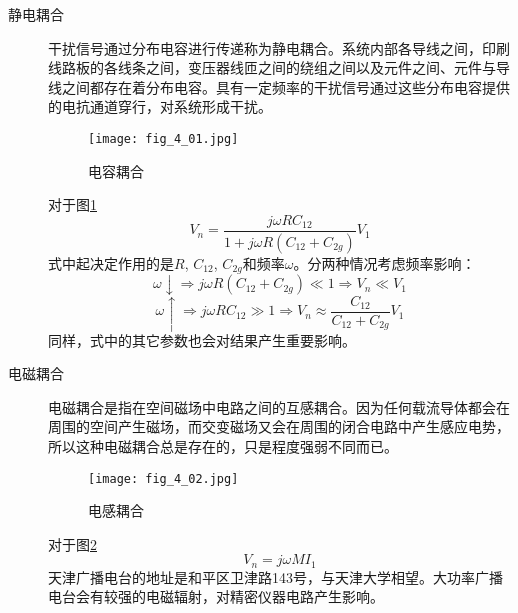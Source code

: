 \begin{description}
  \item[静电耦合]
  干扰信号通过分布电容进行传递称为静电耦合。系统内部各导线之间，印刷线路板的各线条之间，变压器线匝之间的绕组之间以及元件之间、元件与导线之间都存在着分布电容。具有一定频率的干扰信号通过这些分布电容提供的电抗通道穿行，对系统形成干扰。

\begin{figure}[h]
  \centering
  \texttt{[image: fig\_4\_01.jpg]}\\
  \caption{电容耦合}\label{fig_4_01}
\end{figure}

\begin{remark}
对于图\ref{fig_4_01}
\begin{equation}
  V_n=\frac{j\omega RC_{12}}{1+j\omega R(C_{12}+C_{2g})}V_1
\end{equation}
式中起决定作用的是$R$, $C_{12}$, $C_{2g}$和频率$\omega$。分两种情况考虑频率影响：
\begin{equation}
\omega\downarrow\Rightarrow j\omega R(C_{12}+C_{2g})\ll 1 \Rightarrow V_n\ll V_1
\end{equation}
\begin{equation}
\omega\uparrow\Rightarrow j\omega RC_{12}\gg 1 \Rightarrow V_n\approx \frac{
C_{12}}{C_{12}+C_{2g}}V_1
\end{equation}
同样，式中的其它参数也会对结果产生重要影响。
\end{remark}



  \item[电磁耦合]
  电磁耦合是指在空间磁场中电路之间的互感耦合。因为任何载流导体都会在周围的空间产生磁场，而交变磁场又会在周围的闭合电路中产生感应电势，所以这种电磁耦合总是存在的，只是程度强弱不同而已。


\begin{figure}[h]
  \centering
  \texttt{[image: fig\_4\_02.jpg]}\\
  \caption{电感耦合}\label{fig_4_02}
\end{figure}

\begin{remark}
对于图\ref{fig_4_02}
\begin{equation}
  V_n=j\omega MI_1
\end{equation}
天津广播电台的地址是和平区卫津路143号，与天津大学相望。大功率广播电台会有较强的电磁辐射，对精密仪器电路产生影响。
\end{remark}


\end{description}
